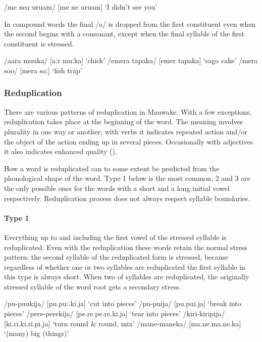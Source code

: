 \ea
/me ne{\textphi}a uru{\textphi}am/  [{{\textprimstress}me ne}{\textphi} {{\textprimstress}uru}{\textphi}am]  `I didn't see you'
\z

In compound words the final /a/ is dropped from the first constituent even when the second begins with a consonant, except when the final syllable of the first constituent is stressed.  

\ea
\ea
/aara muuka/  [{{\textprimstress}aːr {{\textprimstress}}muːka}]  `chick'
\ex
/emera tapaka/  [e{{\textprimstress}mer ta{{\textprimstress}}paka}]  `sago cake'
\ex
/mera soo/  [me{{\textprimstress}ra {{\textprimstress}}soː}]  `fish trap'
\z
\z

\subsubsection{Reduplication}\label{sec:2.3.3.2}

There are various patterns of reduplication in Mauwake. With a few exceptions, reduplication takes place at the beginning of the word.  The meaning involves plurality in one way or another; with verbs it indicates repeated action and/or the object of the action ending up in several pieces. Occasionally with adjectives it also indicates enhanced quality ().

How a word is reduplicated can to some extent be predicted from the phonological shape of the word.  Type 1 below is the most common, 2 and 3 are the only possible ones for the words with a short and a long initial vowel respectively.  Reduplication process does not always respect syllable boundaries.

\paragraph[Type 1]{Type 1}\label{sec:2:a:z:y:x}

Everything up to and including the first vowel of the stressed syllable is reduplicated.  Even with the reduplication these words retain the normal stress pattern: the second syllable of the reduplicated form is stressed, because regardless of whether one or two syllables are reduplicated the first syllable in this type is always short. When two of syllables are reduplicated, the originally stressed syllable of the word root gets a secondary stress.

\ea
\ea
/pu-puukija/  [pu.{{\textprimstress}puː.ki.ja}]  `cut into pieces'
\ex
/pu-puija/  [pu.{{\textprimstress}pui.ja}]  `break into pieces'
\ex
/pere-perekija/  [pe.{{\textprimstress}}re.pe.{{\textprimstress}}{{\textprimstress}}re.ki.ja]  `tear into pieces'
\ex
/kiri-kiripija/  [ki.{{\textprimstress}}ri.ki.{{\textprimstress}}{{\textprimstress}}ri.pi.ja]  `turn round \& round, mix'
\ex
/mane-maneka/  [ma.{{\textprimstress}}ne.ma.{{\textprimstress}}{{\textprimstress}}ne.ka]  `(many) big (things)'
\z
\z



